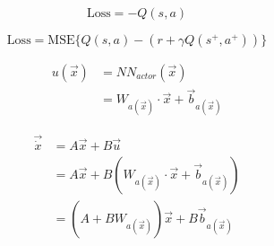 \begin{equation}
    \text{Loss} = -Q(s,a)
\end{equation}

\begin{equation}
    \text{Loss} = \text{MSE}\{Q(s,a) - (r + \gamma Q(s^{+}, a^{+}))\}
\end{equation}

\begin{align}
    u(\Vec{x}) &= NN_{actor}(\Vec{x})\\
    &= W_{a(\Vec{x})}\cdot \Vec{x} + \Vec{b}_{a(\Vec{x})}
\end{align}

\begin{align}
    \Vec{\dot x} &= A\Vec{x} + B\Vec{u}\\
    &= A\Vec{x} + B(W_{a(\Vec{x})}\cdot \Vec{x} + \Vec{b}_{a(\Vec{x})})\\
    &= (A + BW_{a(\Vec{x})})\Vec{x} + B\Vec{b}_{a(\Vec{x})}
\end{align}